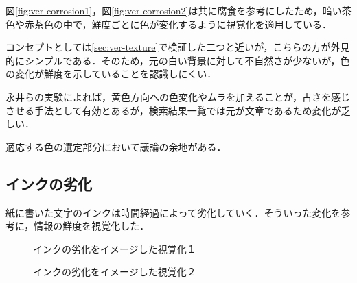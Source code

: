 図\ref{fig:ver-corrosion1}，図\ref{fig:ver-corrosion2}は共に腐食を参考にしたため，暗い茶色や赤茶色の中で，鮮度ごとに色が変化するように視覚化を適用している．

コンセプトとしては\ref{sec:ver-texture}で検証した二つと近いが，こちらの方が外見的にシンプルである．そのため，元の白い背景に対して不自然さが少ないが，色の変化が鮮度を示していることを認識しにくい．

永井\cite{fading}らの実験によれば，黄色方向への色変化やムラを加えることが，古さを感じさせる手法として有効とあるが，検索結果一覧では元が文章であるため変化が乏しい．

適応する色の選定部分において議論の余地がある．

\subsection{インクの劣化}
\label{subsec:ver-col-ink}

紙に書いた文字のインクは時間経過によって劣化していく．そういった変化を参考に，情報の鮮度を視覚化した．

\begin{figure}[htbp]
  \begin{minipage}{0.5\hsize}
    \begin{center}
    \end{center}
    \caption{インクの劣化をイメージした視覚化１}
    \label{fig:ver-ink1}
  \end{minipage}
  \begin{minipage}{0.5\hsize}
    \begin{center}
    \end{center}
    \caption{インクの劣化をイメージした視覚化２}
    \label{fig:ver-ink2}
  \end{minipage}
\end{figure}

